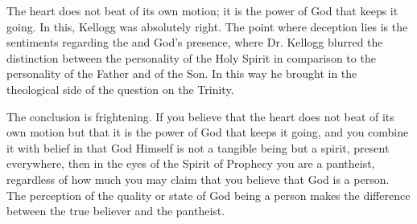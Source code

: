 The heart does not beat of its own motion; it is the power of God that keeps it going. In this, Kellogg was absolutely right. The point where deception lies is the sentiments regarding the  and God’s presence, where Dr. Kellogg blurred the distinction between the personality of the Holy Spirit in comparison to the personality of the Father and of the Son. In this way he brought in the theological side of the question on the Trinity. 

The conclusion is frightening. If you believe that the heart does not beat of its own motion but that it is the power of God that keeps it going, and you combine it with belief in that God Himself is not a tangible being but a spirit, present everywhere, then in the eyes of the Spirit of Prophecy you are a pantheist, regardless of how much you may claim that you believe that God is a person. The perception of the quality or state of God being a person makes the difference between the true believer and the pantheist.
